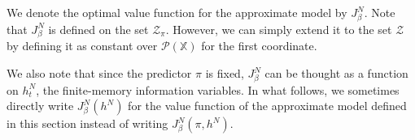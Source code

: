 \documentclass[letterpaper, 10 pt, conference]{ieeeconf}  %
\def\P{{\mathcal P}}
\theoremstyle{definition}
\theoremstyle{remark}
\begin{document}
We denote the optimal value function for the approximate model by $J_\beta^N$. %
Note that $J^N_\beta$ is defined on the set ${\mathcal{Z}}_{\pi}$. However, we can simply extend it to the set ${\mathcal{Z}}$ by defining it as constant over $\P(\mathds{X})$ for the first coordinate.  %

We also note that since the predictor $\pi$ is fixed, $J_\beta^N$ can be thought as a function on $h_t^N$, the finite-memory information variables. In what follows, we sometimes directly write $J_\beta^N(h^N)$ for the value function of the approximate model defined in this section instead of writing $J_\beta^N(\pi,h^N)$.
\end{document}
